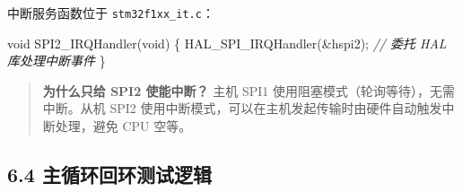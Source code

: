 \documentclass[
  chinese,
  UTF8,
  oneside,
  openany]{ctexbook}
\newenvironment{Shaded}{}{}
\newcommand{\CommentTok}[1]{\textcolor[rgb]{0.38,0.63,0.69}{\textit{#1}}}
\newcommand{\DataTypeTok}[1]{\textcolor[rgb]{0.56,0.13,0.00}{#1}}
\newcommand{\NormalTok}[1]{#1}
\newcommand{\OperatorTok}[1]{\textcolor[rgb]{0.40,0.40,0.40}{#1}}
\begin{document}
中断服务函数位于 \texttt{stm32f1xx\_it.c}：

\begin{Shaded}
\begin{Highlighting}[]
\DataTypeTok{void}\NormalTok{ SPI2\_IRQHandler}\OperatorTok{(}\DataTypeTok{void}\OperatorTok{)}
\OperatorTok{\{}
\NormalTok{  HAL\_SPI\_IRQHandler}\OperatorTok{(\&}\NormalTok{hspi2}\OperatorTok{);}  \CommentTok{// 委托 HAL 库处理中断事件}
\OperatorTok{\}}
\end{Highlighting}
\end{Shaded}

\begin{quote}
\textbf{为什么只给 SPI2 使能中断？} 主机 SPI1
使用阻塞模式（轮询等待），无需中断。从机 SPI2
使用中断模式，可以在主机发起传输时由硬件自动触发中断处理，避免 CPU
空等。
\end{quote}

\subsection{6.4
主循环回环测试逻辑}\label{ux4e3bux5faaux73afux56deux73afux6d4bux8bd5ux903bux8f91}
\end{document}
